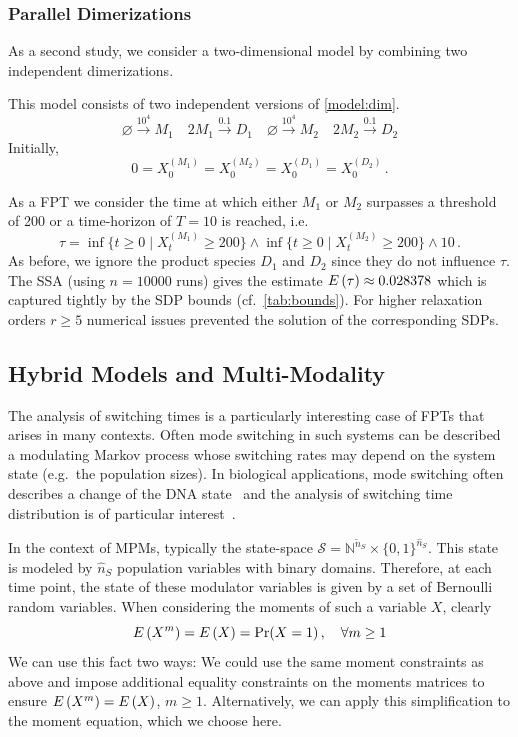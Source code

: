 \subsubsection{Parallel Dimerizations}
As a second study, we consider a two-dimensional model by combining two
independent dimerizations.
\begin{model}\label{model:double_dim} This model consists of two independent versions of \autoref{model:dim}.
	\[
		\varnothing\xrightarrow{10^4}M_1\quad 2M_1\xrightarrow{0.1}D_1\quad \varnothing\xrightarrow{10^4}M_2\quad 2M_2\xrightarrow{0.1}D_2
	\]
	Initially, \[0=X_0^{(M_1)}=X_0^{(M_2)}=X_0^{(D_1)}=X_0^{(D_2)}\,.\]
\end{model}
As a \ac{FPT} we consider the time at which either $M_1$ or $M_2$ surpasses a threshold of \num{200} or a time-horizon of $T=10$
is reached, i.e.
\[ \tau=\inf\{t\geq 0\mid X_t^{(M_1)} \geq 200\}\land \inf\{t\geq 0\mid X_t^{(M_2)} \geq 200\}\land 10\,.
\]
As before, we ignore the product species $D_1$ and $D_2$ since they do not influence $\tau$.
The \ac{SSA}   (using $n=\num{10000}$ runs) gives the estimate ${E}\left(\tau\right)\approx {0.028378}$ %
which is captured tightly by the \ac{SDP} bounds (cf.\ \autoref{tab:bounds}).
For higher relaxation orders $r \geq 5$  numerical issues prevented the solution of the
corresponding \acp{SDP}.

\subsection{Hybrid Models and Multi-Modality}
The analysis of switching times is a particularly interesting case of \acp{FPT} that
arises in many   contexts.
Often mode switching in such systems can be described a modulating Markov process
whose switching rates may depend on the system state (e.g.\ the population sizes).
In biological applications, mode switching often describes a change of the
\acs{DNA} state~\cite{hasenauer2014method,stekel2008strong} and the analysis of
switching time distribution is of particular interest~\cite{spieler2011model,barzel2008calculation}.

In the context of \acp{MPM}, typically the state-space $\mathcal{S}=
\mathbb{N}^{\tilde{n}_S}\times {\{0,1\}}^{\hat{n}_S}$.
This state is modeled by  $\hat{n}_S$ population variables with
binary domains. Therefore, at each time point, the state of these modulator variables
is given by a set of Bernoulli random variables.
When considering the moments of
such a variable $X$, clearly
\[
	{E}\left(X^m\right)={E}\left(X\right)=\Pr(X=1)\,,\quad \forall m\geq 1
\]
We can use this fact two ways: We could use the same moment
constraints
as above and impose additional equality constraints on the moments matrices
to ensure ${E}\left(X^m\right)={E}\left(X\right)$, $m\geq 1$.
Alternatively, we can apply this simplification to the moment equation, which we choose here.


